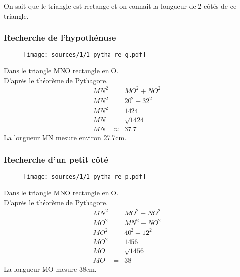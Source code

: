 \documentclass[12pt]{article}
\begin{document}
On sait que le triangle est rectange et on connait la longueur de 2 côtés de ce triangle.

\begin{multicols}{2}

  \subsubsection*{Recherche de l'hypothénuse}

  \begin{multicols}{2}

    \begin{figure}[H]
      \centering
      \texttt{[image: sources/1/1\_pytha-re-g.pdf]}
    \end{figure}

    Dans le triangle MNO rectangle en O.\\
    D'après le théorème de Pythagore.
    \begin{eqnarray*}
      MN^2 &=& MO^2 + NO^2 \\
      MN^2 &=& 20^2 + 32^2 \\
      MN^2 &=&  1424\\
      MN   &=& \sqrt{1424} \\
      MN   &\approx& 37.7 
    \end{eqnarray*}
    La longueur MN mesure environ 27.7cm.

  \end{multicols}

  \subsubsection*{Recherche d'un petit côté}

  \begin{multicols}{2}


    \begin{figure}[H]
      \centering
      \texttt{[image: sources/1/1\_pytha-re-p.pdf]}
    \end{figure}

    Dans le triangle MNO rectangle en O.\\
    D'après le théorème de Pythagore.
    \begin{eqnarray*}
      MN^2 &=& MO^2 + NO^2 \\
      MO^2 &=& MN^2 - NO^2 \\
      MO^2 &=& 40^2 - 12^2 \\
      MO^2 &=& 1456\\
      MO   &=& \sqrt{1456} \\
      MO   &=& 38
    \end{eqnarray*}
    La longueur MO mesure 38cm.

  \end{multicols}
\end{multicols}
\end{document}
